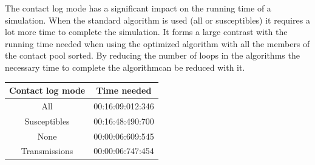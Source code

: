 \documentclass[runningheads]{llncs}
\begin{document}
The contact log mode has a significant impact on the running time of a simulation. When the standard algorithm is used (all or susceptibles) it requires a lot more time to complete the simulation. It forms a large contrast with the running time needed when using the optimized algorithm with all the members of the contact pool sorted. By reducing the number of loops in the algorithms the necessary time to complete the algorithmcan be reduced with it.
\begin{center}
	\begin{tabular}{ | c | c |}
		\hline
		Contact log mode & Time needed \\ \hline
		All & 00:16:09:012:346 \\ \hline
		Susceptibles & 00:16:48:490:700 \\ \hline
		None & 00:00:06:609:545 \\ \hline
		Transmissions & 00:00:06:747:454 \\
		\hline	
	\end{tabular}
\end{center} 
\end{document}
